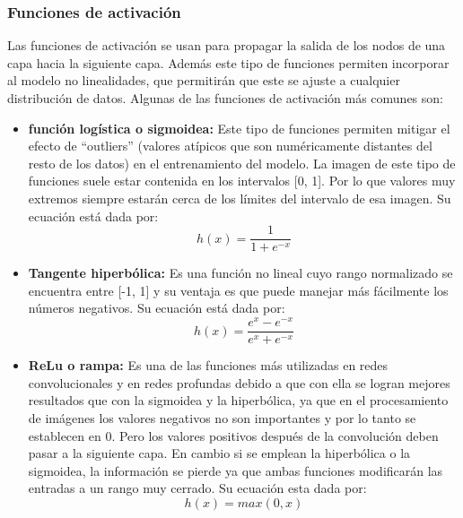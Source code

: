 \subsubsection{Funciones de activación}
Las funciones de activación se usan para propagar la salida de los nodos de una capa hacia la siguiente capa. Además este tipo de funciones permiten incorporar al modelo no linealidades, que permitirán que este se ajuste a cualquier distribución de datos. Algunas de las funciones de activación más comunes son:
\begin{itemize}
    \item \textbf{función logística o sigmoidea:} Este tipo de funciones permiten mitigar el efecto de ``outliers'' (valores atípicos que son numéricamente distantes del resto de los datos) en el entrenamiento del modelo. La imagen de este tipo de funciones suele estar contenida en los intervalos [0, 1]. Por lo que valores muy extremos siempre estarán cerca de los límites del intervalo de esa imagen. Su ecuación está dada por:
    \begin{equation}
        h(x) = \frac{1}{1 + e^{-x}}
    \end{equation}
    \item \textbf{Tangente hiperbólica:} Es una función no lineal cuyo rango normalizado se encuentra entre [-1, 1] y su ventaja es que puede manejar más fácilmente los números negativos. Su ecuación está dada por:
    \begin{equation}
        h(x) = \frac{e^{x} - e^{-x}}{e^{x} + e^{-x}}
    \end{equation}
    \item \textbf{ReLu o rampa:} Es una de las funciones más utilizadas en redes convolucionales y en redes profundas debido a que con ella se logran mejores resultados que con la sigmoidea y la hiperbólica, ya que en el procesamiento de imágenes los valores negativos no son importantes y por lo tanto se establecen en 0. Pero los valores positivos después de la convolución deben pasar a la siguiente capa. En cambio si se emplean la hiperbólica o la sigmoidea, la información se pierde ya que ambas funciones modificarán las entradas a un rango muy cerrado. Su ecuación esta dada por:
    \begin{equation}
        h(x) = max(0,x)
    \end{equation}
\end{itemize}
